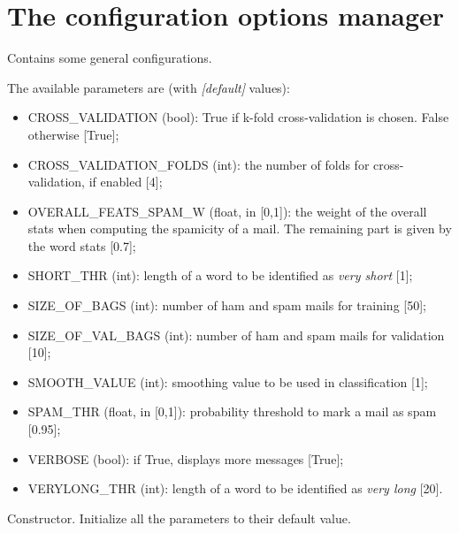 \documentclass[letterpaper,10pt,english]{sphinxmanual}
\begin{document}
\section{The configuration options manager}
\label{index:module-config}\label{index:the-configuration-options-manager}

\begin{fulllineitems}
\label{index:config.Config}
Contains some general configurations.

The available parameters are (with \emph{{[}default{]}} values):
\begin{itemize}
\item {} 
CROSS\_VALIDATION (bool): True if k-fold cross-validation is chosen.        False otherwise {[}True{]};

\item {} 
CROSS\_VALIDATION\_FOLDS (int): the number of folds for        cross-validation, if enabled {[}4{]};

\item {} 
OVERALL\_FEATS\_SPAM\_W (float, in {[}0,1{]}): the weight of the overall stats        when computing the spamicity of a mail. The remaining part is given by        the word stats {[}0.7{]};

\item {} 
SHORT\_THR (int): length of a word to be identified as \emph{very short} {[}1{]};

\item {} 
SIZE\_OF\_BAGS (int): number of ham and spam mails for training {[}50{]};

\item {} 
SIZE\_OF\_VAL\_BAGS (int): number of ham and spam mails for validation {[}10{]};

\item {} 
SMOOTH\_VALUE (int): smoothing value to be used in classification {[}1{]};

\item {} 
SPAM\_THR (float, in {[}0,1{]}): probability threshold to mark a mail as spam {[}0.95{]};

\item {} 
VERBOSE (bool): if True, displays more messages {[}True{]};

\item {} 
VERYLONG\_THR (int): length of a word to be identified as \emph{very long} {[}20{]}.

\end{itemize}

\begin{fulllineitems}
\label{index:config.Config.__init__}
Constructor. Initialize all the parameters to their default value.

\end{fulllineitems}


\end{fulllineitems}
\end{document}
